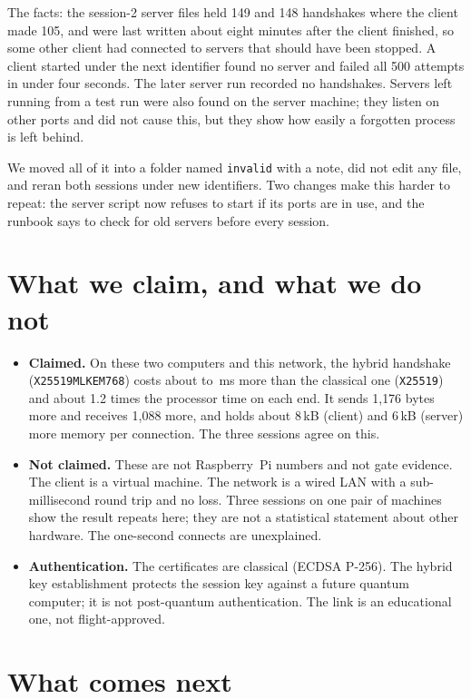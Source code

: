 \documentclass[11pt,a4paper]{article}
\newcommand{\prog}[1]{\texttt{#1}}
\begin{document}
The facts: the session-2 server files held 149 and 148 handshakes where the client made 105, and
were last written about eight minutes after the client finished, so some other client had connected
to servers that should have been stopped. A client started under the next identifier found no server and
failed all 500 attempts in under four seconds. The later server run recorded no handshakes. Servers left running from a
test run were also found on the server machine; they listen on other ports and did not cause this,
but they show how easily a forgotten process is left behind.

We moved all of it into a folder named \texttt{invalid} with a note, did not edit any file, and
reran both sessions under new identifiers. Two changes make this harder to repeat: the server script
now refuses to start if its ports are in use, and the runbook says to check for old servers before
every session.

\section{What we claim, and what we do not}

\begin{itemize}\setlength\itemsep{0.1em}
\item \textbf{Claimed.} On these two computers and this network, the hybrid handshake
  (\prog{X25519MLKEM768}) costs about \TlsDiffThree{} to \TlsDiffOne{}\,ms more than the classical one
  (\prog{X25519}) and about 1.2 times the processor time on each end. It sends 1{,}176 bytes more and
  receives 1{,}088 more, and holds about 8\,kB (client) and 6\,kB (server) more memory per
  connection. The three sessions agree on this.
\item \textbf{Not claimed.} These are not Raspberry~Pi numbers and not gate evidence. The client is a
  virtual machine. The network is a wired LAN with a sub-millisecond round trip and no loss. Three
  sessions on one pair of machines show the result repeats here; they are not a statistical
  statement about other hardware. The one-second connects are unexplained.
\item \textbf{Authentication.} The certificates are classical (ECDSA P-256). The hybrid key
  establishment protects the session key against a future quantum computer; it is not post-quantum
  authentication. The link is an educational one, not flight-approved.
\end{itemize}

\section{What comes next}
\end{document}
